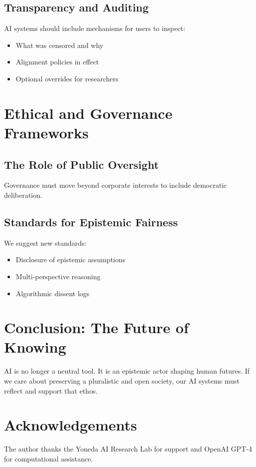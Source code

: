 \documentclass{article}
\begin{document}
\subsection{Transparency and Auditing}
AI systems should include mechanisms for users to inspect:
\begin{itemize}
    \item What was censored and why
    \item Alignment policies in effect
    \item Optional overrides for researchers
\end{itemize}

\section{Ethical and Governance Frameworks}
\subsection{The Role of Public Oversight}
Governance must move beyond corporate interests to include democratic deliberation.

\subsection{Standards for Epistemic Fairness}
We suggest new standards:
\begin{itemize}
    \item Disclosure of epistemic assumptions
    \item Multi-perspective reasoning
    \item Algorithmic dissent logs
\end{itemize}

\section{Conclusion: The Future of Knowing}
AI is no longer a neutral tool. It is an epistemic actor shaping human futures. If we care about preserving a pluralistic and open society, our AI systems must reflect and support that ethos.

\section*{Acknowledgements}
The author thanks the Yoneda AI Research Lab for support and OpenAI GPT-4 for computational assistance.



\end{document}
